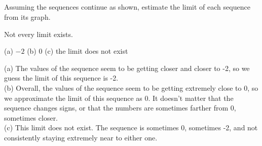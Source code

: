 %
%

\subsection*{\Conceptual}
\begin{Mquestion}
Assuming the sequences continue as shown, estimate the limit of each sequence from its graph.
\begin{center}


\end{center}
\end{Mquestion}
\begin{hint}
Not every limit exists.
\end{hint}
\begin{answer}
(a) $-2$ \qquad (b) 0 \qquad (c) the limit does not exist
\end{answer}
\begin{solution}
(a) The values of the sequence seem to be getting closer and closer to -2, so we guess the limit of this sequence is -2.\\
(b) Overall, the values of the sequence seem to be getting extremely close to 0, so we approximate the limit of this sequence as 0. It doesn't matter that the sequence changes signs, or that the numbers are sometimes farther from 0, sometimes closer. \\
(c) This limit does not exist. The sequence is sometimes 0, sometimes -2, and not consistently staying extremely near to either one.
\end{solution}
